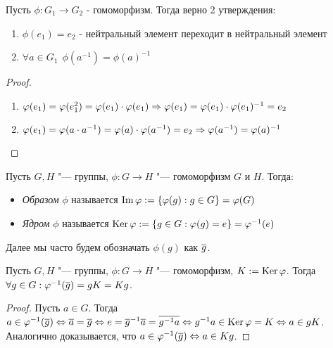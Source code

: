 \begin{proposition}
	Пусть $\phi \colon G_1 \to G_2$ - гомоморфизм. Тогда верно 2 утверждения:
	\begin{enumerate}
		\item $\phi(e_1) = e_2$ - нейтральный элемент переходит в нейтральный элемент
		
		\item $\forall a \in G_1\ \ \phi(a^{-1}) = \phi(a)^{-1}$
	\end{enumerate}
\end{proposition}

\begin{proof}~
	\begin{enumerate}
		\item \(\varphi(e_1) = \varphi(e_1^2) = \varphi(e_1) \cdot \varphi(e_1) \Rightarrow \varphi(e_1) = \varphi(e_1) \cdot \varphi(e_1)^{-1} = e_2\)
		
		\item \(\varphi(e_1) = \varphi(a \cdot a^{-1}) = \varphi(a) \cdot \varphi(a^{-1}) = e_2 \Rightarrow \varphi(a^{-1}) = \varphi(a)^{-1}\)
	\end{enumerate}
\end{proof}

\begin{definition}
	Пусть $G, H$ "--- группы, $\phi : G \to H$ "--- гомоморфизм $G$ и $H$. Тогда:
	\begin{itemize}
		\item \textit{Образом} $\phi$ называется $\operatorname{Im} \varphi := \{\varphi(g): g \in G\} = \varphi(G)$
		\item \textit{Ядром} $\phi$ называется $\operatorname{Ker} \varphi := \{g \in G: \varphi(g) = e\} = \varphi^{-1}(e)$
	\end{itemize}
\end{definition}

\begin{note}
	Далее мы часто будем обозначать $\phi(g)$ как $\overline{g}$.
\end{note}

\begin{proposition}
	Пусть $G, H$ "--- группы, $\phi: G \to H$ "--- гомоморфизм, $K := \operatorname{Ker} \varphi$. Тогда $\forall g \in G: \varphi^{-1}(\overline{g}) = gK = Kg$.
\end{proposition}

\begin{proof}
	Пусть $a \in G$. Тогда $a \in \phi^{-1}(\ol{g}) \Leftrightarrow \ol{a} = \ol{g} \Leftrightarrow e \hm= \ol{g}^{-1}\ol{a} = \ol{g^{-1}a} \Leftrightarrow g^{-1}a \hm\in \ke \phi = K \Leftrightarrow a \in gK$. Аналогично доказывается, что $a \in \varphi^{-1}(\overline{g}) \Leftrightarrow a \in Kg$.
\end{proof}

